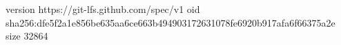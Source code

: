 version https://git-lfs.github.com/spec/v1
oid sha256:dfe5f2a1e856be635aa6ce663b494903172631078fe6920b917afa6f66375a2e
size 32864
